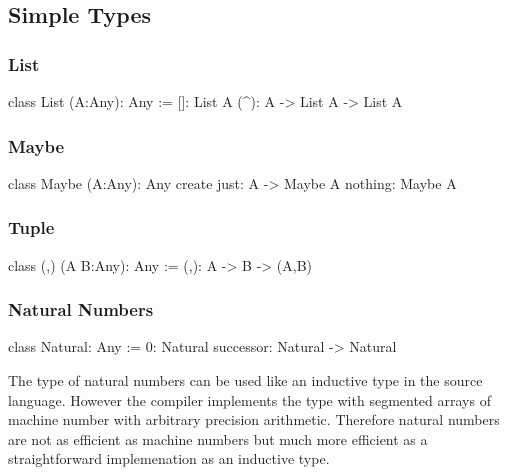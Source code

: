 \subsection{Simple Types}
\label{sec:simple-types}



\subsubsection{List}

\begin{alba}
  class
    List (A:Any): Any
  :=
    []: List A
    (^): A -> List A -> List A
\end{alba}
\vskip 2mm




\subsubsection{Maybe}

\begin{alba}
  class
    Maybe (A:Any): Any
  create
    just:    A -> Maybe A
    nothing: Maybe A
\end{alba}
\vskip 2mm


\subsubsection{Tuple}

\begin{alba}
  class
    (,) (A B:Any): Any
  :=
    (,):    A -> B -> (A,B)
\end{alba}
\vskip 2mm




\subsubsection{Natural Numbers}

\begin{alba}
  class
    Natural: Any
  :=
    0: Natural
    successor: Natural -> Natural
\end{alba}

The type of natural numbers can be used like an inductive type in the source
language. However the compiler implements the type with segmented arrays of
machine number with arbitrary precision arithmetic. Therefore natural numbers
are not as efficient as machine numbers but much more efficient as a
straightforward implemenation as an inductive type.


